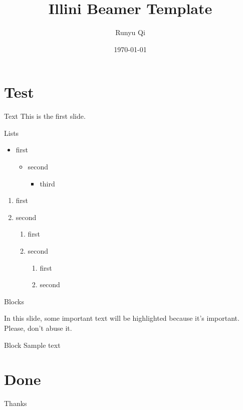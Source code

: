 \documentclass[aspectratio=169]{beamer} %
\title{Illini Beamer Template}
\author{Runyu Qi}
\institute{University of Illinois at Urbana-Champaign}
\date{\today}
\begin{document}
\begin{frame}
    \titlepage
\end{frame}

\begin{frame}
    \tableofcontents
\end{frame}

\section{Test}

\begin{frame}{Text}
    This is the first slide.
\end{frame}

\begin{frame}{Lists}
    \begin{itemize}
        \item first
        \begin{itemize}
            \item second
            \begin{itemize}
                \item third
            \end{itemize} 
        \end{itemize}
    \end{itemize}

    \begin{enumerate}
        \item first
        \item second
        \begin{enumerate}
            \item first
            \item second
            \begin{enumerate}
                \item first
                \item second
            \end{enumerate}
        \end{enumerate}
            
    \end{enumerate}
\end{frame}

\begin{frame}{Blocks}
    
    In this slide, some important text will be
    \alert{highlighted} because it's important.
    Please, don't abuse it.
    
    \begin{block}{Block}
    Sample text
    \end{block}

\end{frame}

\section{Done}
\begin{frame}
    \centering \Huge Thanks
\end{frame}
\end{document}
